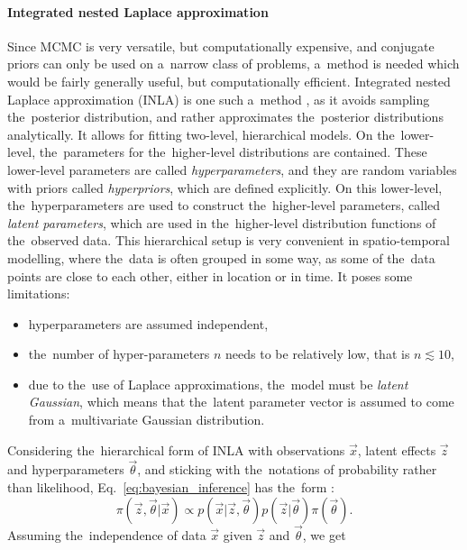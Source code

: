 \paragraph{Integrated nested Laplace approximation}
Since MCMC is very versatile, but computationally expensive, and conjugate priors can only be used on a~narrow class of problems, a~method is needed which would be fairly generally useful, but computationally efficient. Integrated nested Laplace approximation ({INLA}) is one such a~method \citep{rue2009approximate,martins2013bayesian}, as it avoids sampling the~posterior distribution, and rather approximates the~posterior distributions analytically. It allows for fitting two-level, hierarchical models. On the~lower-level, the~parameters for the~higher-level distributions are contained. These lower-level parameters are called \textit{hyperparameters}, and they are random variables with priors called \textit{hyperpriors}, which are defined explicitly. On this lower-level, the~hyperparameters are used to construct the~higher-level parameters, called \textit{latent parameters}, which are used in the~higher-level distribution functions of the~observed data. This hierarchical setup is very convenient in spatio-temporal modelling, where the~data is often grouped in some way, as some of the~data points are close to each other, either in location or in time. It poses some limitations:
\begin{itemize}
    \item hyperparameters are assumed independent,
    \item the~number of hyper-parameters $n$ needs to be relatively low, that is $n \lesssim 10$,
    \item due to the~use of Laplace approximations, the~model must be \textit{latent Gaussian}, which means that the~latent parameter vector is assumed to come from a~multivariate Gaussian distribution.
\end{itemize}
Considering the~hierarchical form of INLA with observations $\vec{x}$, latent effects $\vec{z}$ and hyperparameters $\vec{\theta}$, and sticking with the~notations of probability rather than likelihood, Eq.~\ref{eq:bayesian_inference} has the~form \citep{gomez2020bayesian}:
\begin{equation}
    \pi(\vec{z}, \vec{\theta}|\vec{x}) \propto p(\vec{x}|\vec{z}, \vec{\theta}) p(\vec{z}|\vec{\theta}) \pi(\vec{\theta}).
    \label{eq:bayesian_hierarchical}
\end{equation}
Assuming the~independence of data $\vec{x}$ given $\vec{z}$ and $\vec{\theta}$, we get
